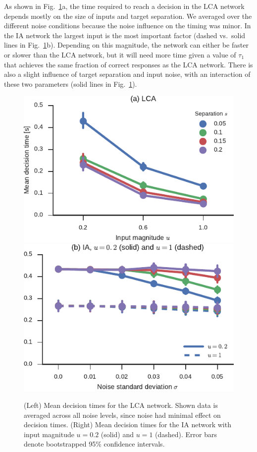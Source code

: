 \documentclass[10pt,letterpaper]{article}
\begin{document}
As shown in Fig.~\ref{fig:time}a, the time required to reach a decision in the LCA network depends mostly on the size of inputs and target separation.
We averaged over the different noise conditions because the noise influence on the timing was minor.
In the IA network the largest input is the most important factor (dashed vs.\ solid lines in Fig.~\ref{fig:time}b).
Depending on this magnitude, the network can either be faster or slower than the LCA network, but it will need more time given a value of $\tau_1$ that achieves the same fraction of correct responses as the LCA network.
There is also a slight influence of target separation and input noise, with an interaction of these two parameters (solid lines in Fig.~\ref{fig:time}).
\begin{figure}[t]
    \includegraphics{figures/time1}
    \hfill
    \includegraphics{figures/time2}
    \caption{
        (Left) Mean decision times for the LCA network.
        Shown data is averaged across all noise levels, since noise had minimal effect on decision times.
        (Right) Mean decision times for the IA network with input magnitude $u = 0.2$ (solid) and $u = 1$ (dashed).
        Error bars denote bootstrapped 95\% confidence intervals.
    }\label{fig:time}
\end{figure}
\end{document}

